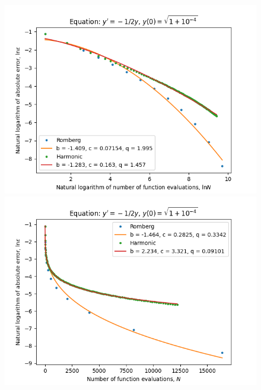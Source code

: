 \begin{figure}[H]
\centering
\begin{minipage}{0.45\textwidth}
\centering
\includegraphics[scale=0.45]{emr_plots/quad_sing_4_hp_log_log_pow_fit_trend.png}
\end{minipage}
\begin{minipage}{0.45\textwidth}
\centering
\includegraphics[scale=0.45]{emr_plots/quad_sing_4_hp_trend.png}
\end{minipage}
\end{figure}

